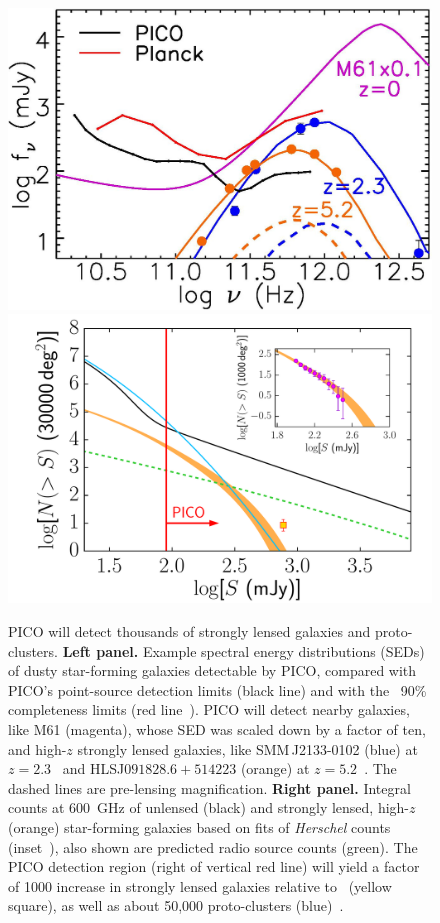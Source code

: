 \documentclass[PICOReport.tex]{subfiles}
\begin{document}
\begin{figure}
\begin{center}
\includegraphics[width=0.41\columnwidth, trim={0 0 0 0cm}, clip]{images/fig_SED_PICO.jpg}
\hspace{0.75cm}
\includegraphics[width=0.4\columnwidth, trim={0 0 0 0cm}, clip]{images/NgtF_pico_NEW.pdf}
\vskip-0.3cm
\caption{ \captiontext
PICO will detect thousands of strongly lensed galaxies and proto-clusters. \textbf{Left panel.} Example spectral energy distributions (SEDs) of dusty star-forming galaxies detectable by PICO, compared with PICO's point-source detection limits (black line) and with the \planck\ 90\% completeness limits (red line~\cite{PCCS2}). PICO will detect nearby galaxies, like M61 (magenta), whose SED was scaled down by a factor of ten, and high-$z$ strongly lensed galaxies, like SMM\,J2133-0102 (blue)  at $z=2.3$~\cite{Swinbank2010} and HLSJ$091828.6{+}514223$ (orange) at $z=5.2$~\cite{Combes2012}. The dashed lines are pre-lensing magnification.  \textbf{Right panel.} Integral counts at 600~GHz of unlensed (black) and strongly lensed, high-$z$ (orange) star-forming galaxies based on fits of \textit{Herschel} counts (inset~\citep{Negrello2017lensed}), also shown are predicted radio source counts (green). The PICO detection region (right of vertical red line) will yield a factor of 1000 increase in strongly lensed galaxies relative to \planck~(yellow square), as well as about 
50,000 proto-clusters (blue)~\citep{Negrello2017protocl}.}
\label{fig:SED3}
\end{center}
\vspace{-0.15in}
\end{figure}
\end{document}
